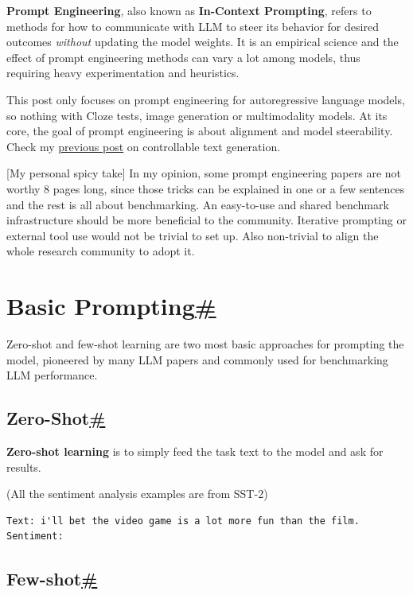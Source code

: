\textbf{Prompt Engineering}, also known as \textbf{In-Context Prompting}, refers to methods for how to communicate with LLM to steer its behavior for desired outcomes \emph{without} updating the model weights. It is an empirical science and the effect of prompt engineering methods can vary a lot among models, thus requiring heavy experimentation and heuristics.

This post only focuses on prompt engineering for autoregressive language models, so nothing with Cloze tests, image generation or multimodality models. At its core, the goal of prompt engineering is about alignment and model steerability. Check my \href{https://lilianweng.github.io/posts/2021-01-02-controllable-text-generation/}{previous post} on controllable text generation.

{{[}My personal spicy take{]}} In my opinion, some prompt engineering papers are not worthy 8 pages long, since those tricks can be explained in one or a few sentences and the rest is all about benchmarking. An easy-to-use and shared benchmark infrastructure should be more beneficial to the community. Iterative prompting or external tool use would not be trivial to set up. Also non-trivial to align the whole research community to adopt it.

\section{\texorpdfstring{Basic Prompting\hyperref[basic-prompting]{\#}}{Basic Prompting\#}}\label{basic-prompting}

Zero-shot and few-shot learning are two most basic approaches for prompting the model, pioneered by many LLM papers and commonly used for benchmarking LLM performance.

\subsection{\texorpdfstring{Zero-Shot\hyperref[zero-shot]{\#}}{Zero-Shot\#}}\label{zero-shot}

\textbf{Zero-shot learning} is to simply feed the task text to the model and ask for results.

(All the sentiment analysis examples are from SST-2)

\begin{verbatim}
Text: i'll bet the video game is a lot more fun than the film.
Sentiment:
\end{verbatim}

\subsection{\texorpdfstring{Few-shot\hyperref[few-shot]{\#}}{Few-shot\#}}\label{few-shot}


